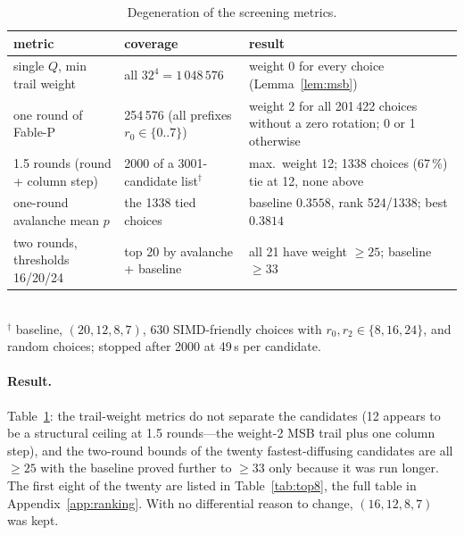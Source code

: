 \documentclass{iacrtrans}
\newcommand{\FableP}{\textsf{Fable-P}\xspace}
\newcommand{\WuncTwo}{33}    %
\begin{document}
\begin{table}[htb]
\centering
\caption{Degeneration of the screening metrics.}
\label{tab:screen}
\small
\begin{tabular}{p{2.9cm}p{3.6cm}p{5.2cm}}
\toprule
metric & coverage & result\\
\midrule
single $Q$, min trail weight & all $32^4 = 1\,048\,576$ & weight 0 for every choice (Lemma~\ref{lem:msb})\\
one round of \FableP & 254\,576 (all prefixes $r_0 \in \{0..7\}$) & weight 2 for all 201\,422 choices without a zero rotation; 0 or 1 otherwise\\
1.5 rounds (round + column step) & 2000 of a 3001-candidate list$^\dagger$ & max.\ weight 12; 1338 choices (67\,\%) tie at 12, none above\\
one-round avalanche mean $p$ & the 1338 tied choices & baseline $0.3558$, rank 524/1338; best $0.3814$\\
two rounds, thresholds 16/20/24 & top 20 by avalanche + baseline & all 21 have weight $\geq 25$; baseline $\geq \WuncTwo$\\
\bottomrule
\end{tabular}\\[2pt]
{\footnotesize $^\dagger$ baseline, $(20,12,8,7)$, 630 SIMD-friendly choices with $r_0,r_2\in\{8,16,24\}$, and random choices; stopped after 2000 at 49\,s per candidate.}
\end{table}

\paragraph{Result.} Table~\ref{tab:screen}: the trail-weight metrics do not separate the candidates (12 appears to be a structural ceiling at 1.5 rounds---the weight-2 MSB trail plus one column step), and the two-round bounds of the twenty fastest-diffusing candidates are all $\geq 25$ with the baseline proved further to $\geq \WuncTwo$ only because it was run longer. The first eight of the twenty are listed in Table~\ref{tab:top8}, the full table in Appendix~\ref{app:ranking}. With no differential reason to change, $(16,12,8,7)$ was kept.
\end{document}
